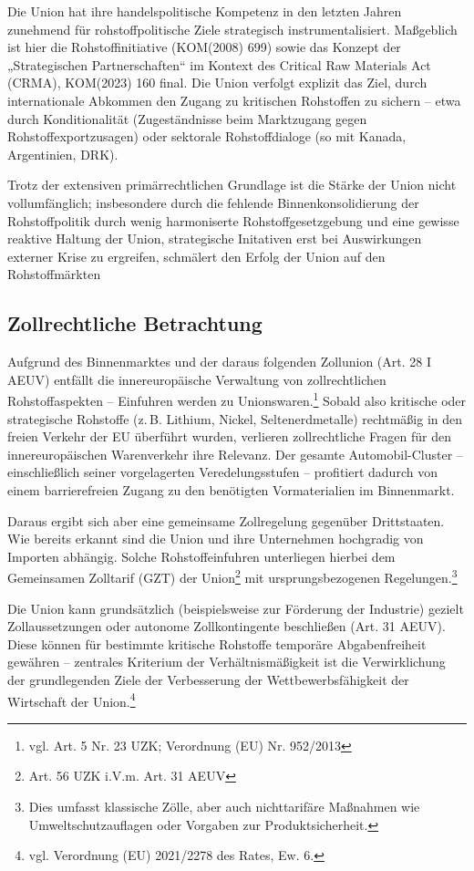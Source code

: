 \documentclass[12pt,a4paper,oneside]{book} %
\begin{document}
Die Union hat ihre handelspolitische Kompetenz in den letzten Jahren zunehmend für rohstoffpolitische Ziele strategisch instrumentalisiert. Maßgeblich ist hier die Rohstoffinitiative (KOM(2008) 699) sowie das Konzept der „Strategischen Partnerschaften“ im Kontext des Critical Raw Materials Act (CRMA), KOM(2023) 160 final. Die Union verfolgt explizit das Ziel, durch internationale Abkommen den Zugang zu kritischen Rohstoffen zu sichern -- etwa durch Konditionalität (Zugeständnisse beim Marktzugang gegen Rohstoffexportzusagen) oder sektorale Rohstoffdialoge (so mit Kanada, Argentinien, DRK).

Trotz der extensiven primärrechtlichen Grundlage ist die Stärke der Union nicht vollumfänglich; insbesondere durch die fehlende Binnenkonsolidierung der Rohstoffpolitik durch wenig harmoniserte Rohstoffgesetzgebung und eine gewisse reaktive Haltung der Union, strategische Initativen erst bei Auswirkungen externer Krise zu ergreifen, schmälert den Erfolg der Union auf den Rohstoffmärkten






\subsection{Zollrechtliche Betrachtung}
Aufgrund des Binnenmarktes und der daraus folgenden Zollunion (Art. 28 I AEUV) entfällt die innereuropäische Verwaltung von zollrechtlichen Rohstoffaspekten -- Einfuhren werden zu \glqq Unionswaren\grqq.\footnote{vgl. Art. 5 Nr. 23 UZK; Verordnung (EU) Nr. 952/2013} Sobald also kritische oder strategische Rohstoffe (z. B. Lithium, Nickel, Seltenerdmetalle) rechtmäßig in den freien Verkehr der EU überführt wurden, verlieren zollrechtliche Fragen für den innereuropäischen Warenverkehr ihre Relevanz. Der gesamte Automobil-Cluster – einschließlich seiner vorgelagerten Veredelungsstufen – profitiert dadurch von einem barrierefreien Zugang zu den benötigten Vormaterialien im Binnenmarkt.

Daraus ergibt sich aber eine gemeinsame Zollregelung gegenüber Drittstaaten. Wie bereits erkannt sind die Union und ihre Unternehmen hochgradig von Importen abhängig. Solche Rohstoffeinfuhren unterliegen hierbei dem Gemeinsamen Zolltarif (GZT) der Union\footnote{Art. 56 UZK i.V.m. Art. 31 AEUV} mit ursprungsbezogenen Regelungen.\footnote{Dies umfasst klassische Zölle, aber auch nichttarifäre Maßnahmen wie Umweltschutzauflagen oder Vorgaben zur Produktsicherheit.}

Die Union kann grundsätzlich (beispielsweise zur Förderung der Industrie) gezielt Zollaussetzungen oder autonome Zollkontingente beschließen (Art. 31 AEUV). Diese können für bestimmte kritische Rohstoffe temporäre Abgabenfreiheit gewähren -- zentrales Kriterium der Verhältnismäßigkeit ist die Verwirklichung der grundlegenden Ziele der Verbesserung der Wettbewerbsfähigkeit der Wirtschaft der Union.\footnote{vgl. Verordnung (EU) 2021/2278 des Rates, Ew. 6.}
\end{document}
